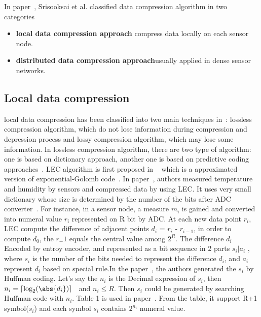 \documentclass{report}
\begin{document}
In paper~\cite{srisooksai2012practical}, Srisooksai et al. classified data compression algorithm in two categories
\begin{itemize}
    \item \textbf{local data compression approach} compress data locally on each sensor node.
    \item \textbf{distributed data compression approach}usually applied in dense sensor networks.
\end{itemize}
\subsection{Local data compression}
local data compression has been classified into two main techniques in~\cite{srisooksai2012practical}: lossless compression algorithm, which do not lose information during compression and depression process and lossy compression algorithm, which may lose some information.
In lossless compression algorithm, there are two type of algorithm: one is based on dictionary approach, another one is based on predictive coding approaches~\cite{srisooksai2012practical}.
LEC algorithm is first proposed in ~\cite{marcelloni2008simple} which is a approximated version of exponential-Golomb code~\cite{teuhola1978compression}. In paper~\cite{marcelloni2008simple}, authors measured temperature and humidity by sensors and compressed data by using LEC. It uses very small dictionary whose size is determined by the number of the bits after ADC converter~\cite{marcelloni2008simple}. For instance, in a sensor node, a measure $m_i$ is gained and converted into numeral value $r_i$ represented on R bit by ADC. At each new data point $r_i$, LEC compute the difference of adjacent points $d_i$ = $r_i$ - $r_{i-1}$, in order to compute $d_0$, the $r_-1$ equals the central value among $2^R$. The difference $d_i$ Encoded by entroy encoder, and represented as a bit sequence in 2 parts $s_i | a_i$ , where $s_i$ is the number of the bits needed to represent the difference $d_i$, and $a_i$ represent $d_i$ based on special rule.In the paper~\cite{marcelloni2008simple}, the authors generated the $s_i$ by Huffman coding. Let's say the $n_i$ is the Decimal expression of $s_i$, then  
$n_i = \lceil\log_2(\abs{d_i})\rceil$~\cite{marcelloni2008simple}
and $n_i \leq R$. Then $s_i$ could be generated by searching Huffman code with $n_i$. Table 1 is used in paper~\cite{marcelloni2008simple}. From the table, it support R+1 symbol($s_i$) and each symbol $s_i$ contains $2^{n_i}$ numeral value. 
\end{document}
